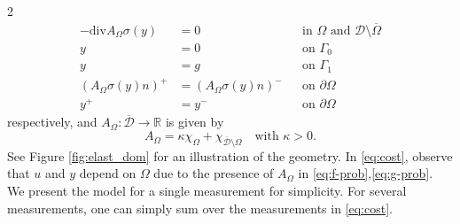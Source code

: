 \documentclass[a4paper, oneside]{article}
\newcommand{\Om}{\Omega}
\newcommand{\tred}{\textcolor{red}}
\begin{document}
\begin{multicols}{2}
\begin{equation}
	\begin{aligned}
    -\mathrm{div} A_{\Omega} \sigma(y) &= 0 && \text{in } \Om  \text{ and } \mathcal{D}\setminus\overline \Omega \\
                                     y &= 0 && \text{on } \Gamma_{0} \\
                                     y &= g && \text{on } \Gamma_{1}   \\
			 (A_{\Omega} \sigma(y)n)^+ &= (A_{\Omega} \sigma(y)n)^- && \text{on } \partial\Omega\\      
								   y^+ &= y^- && \text{on } \partial\Om       
	\end{aligned}
\end{equation}
respectively, and $A_{\Omega}:\overline{\mathcal{D}} \rightarrow \mathds{R}$ is given by
\begin{equation}\label{eq:AOmega}
A_{\Omega} = \kappa\chi_{\Omega} + \chi_{\overline{\mathcal{D}}\setminus\Omega}
\quad \text{with }\kappa>0.
\end{equation}
See Figure \ref{fig:elast_dom} for an illustration of the geometry. In \eqref{eq:cost}, observe that $u$ and $y$ depend on $\Omega$ due to
the presence of $A_\Omega$ in \eqref{eq:f-prob},\eqref{eq:g-prob}.
We present the model for a single measurement for simplicity. 
For several measurements, one can simply sum over the measurements in \eqref{eq:cost}.

 


\end{multicols}
\end{document}
